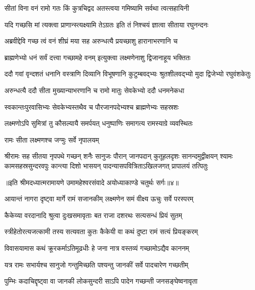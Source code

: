 \twolineshloka
{सीतां विना वनं रामो गतः किं कुत्रचिद्वद}
{अतस्त्वया गमिष्यामि सर्वथा त्वत्सहायिनी} %

\twolineshloka
{यदि गच्छसि मां त्यक्त्वा प्राणान्स्त्यक्ष्यामि तेऽग्रतः}
{इति तं निश्चयं ज्ञात्वा सीताया रघुनन्दनः} %

\twolineshloka
{अब्रवीद्देवि गच्छ त्वं वनं शीघ्रं मया सह}
{अरुन्धत्यै प्रयच्छाशु हारानाभरणानि च} %

\twolineshloka
{ब्राह्मणेभ्यो धनं सर्वं दत्त्वा गच्छामहे वनम्}
{इत्युक्त्वा लक्ष्मणेनाशु द्विजानाहूय भक्तितः} %

\fourlineindentedshloka
{ददौ गवां वृन्दशतं धनानि}
{वस्त्राणि दिव्यानि विभूषणानि}
{कुटुम्बवद्भ्यः श्रुतशीलवद्भ्यो}
{मुदा द्विजेभ्यो रघुवंशकेतुः} %

\twolineshloka
{अरुन्धत्यै ददौ सीता मुख्यान्याभरणानि च}
{रामो मातुः सेवकेभ्यो ददौ धनमनेकधा} %

\twolineshloka
{स्वकान्तःपुरवासिभ्यः सेवकेभ्यस्तथैव च}
{पौरजानपदेभ्यश्च ब्राह्मणेभ्यः सहस्रशः} %

\twolineshloka
{लक्ष्मणोऽपि सुमित्रां तु कौसल्यायै समर्पयत्}
{धनुष्पाणिः समागत्य रामस्याग्रे व्यवस्थितः} %

\onelineshloka
{रामः सीता लक्ष्मणश्च जग्मुः सर्वे नृपालयम्} %

{श्रीरामः सह सीतया नृपपथे गच्छन् शनैः सानुजः}
{पौरान् जानपदान् कुतूहलदृशः सानन्दमुद्वीक्षयन्}
{श्यामः कामसहस्रसुन्दरवपुः कान्त्या दिशो भासयन्}
{पादन्यासपवित्रिताऽखिलजगत् प्रापालयं तत्पितुः} %

{॥इति श्रीमदध्यात्मरामायणे उमामहेश्वरसंवादे
अयोध्याकाण्डे चतुर्थः सर्गः॥४॥
}




\twolineshloka
{आयान्तं नागरा दृष्ट्वा मार्गे रामं सजानकीम्}
{लक्ष्मणेन समं वीक्ष्य ऊचुः सर्वे परस्परम्} %

\twolineshloka
{कैकेय्या वरदानादि श्रुत्वा दुःखसमावृताः}
{बत राजा दशरथः सत्यसन्धं प्रियं सुतम्} %

\twolineshloka
{स्त्रीहेतोरत्यजत्कामी तस्य सत्यवता कुतः}
{कैकेयी वा कथं दुष्टा रामं सत्यं प्रियङ्करम्} %

\twolineshloka
{विवासयामास कथं क्रूरकर्माऽतिमूढधीः}
{हे जना नात्र वस्तव्यं गच्छामोऽद्यैव काननम्} %

\twolineshloka
{यत्र रामः सभार्यश्च सानुजो गन्तुमिच्छति}
{पश्यन्तु जानकीं सर्वे पादचारेण गच्छतीम्} %

\twolineshloka
{पुम्भिः कदाचिद्दृष्ट्वा वा जानकी लोकसुन्दरी}
{साऽपि पादेन गच्छन्ती जनसङ्घेष्वनावृता} %


